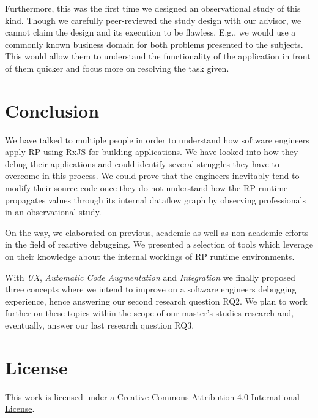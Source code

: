 \documentclass[12pt,a4paper]{article}
\begin{document}
Furthermore, this was the first time we designed an observational study of this kind. Though we carefully peer-reviewed the study design with our advisor, we cannot claim the design and its execution to be flawless. E.g., we would use a commonly known business domain for both problems presented to the subjects. This would allow them to understand the functionality of the application in front of them quicker and focus more on resolving the task given.

\section{Conclusion}
\label{sec:conclusion}

We have talked to multiple people in order to understand how software engineers apply RP using RxJS for building applications. We have looked into how they debug their applications and could identify several struggles they have to overcome in this process. We could prove that the engineers inevitably tend to modify their source code once they do not understand how the RP runtime propagates values through its internal dataflow graph by observing professionals in an observational study.

On the way, we elaborated on previous, academic as well as non-academic efforts in the field of reactive debugging. We presented a selection of tools which leverage on their knowledge about the internal workings of RP runtime environments.

With \emph{UX}, \emph{Automatic Code Augmentation} and \emph{Integration} we finally proposed three concepts where we intend to improve on a software engineers debugging experience, hence answering our second research question RQ2. We plan to work further on these topics within the scope of our master's studies research and, eventually, answer our last research question RQ3.





\section*{License}
\ccby\thinspace\thinspace This work is licensed under a \href{https://creativecommons.org/licenses/by/4.0/}{Creative Commons Attribution 4.0 International License}.
\end{document}
